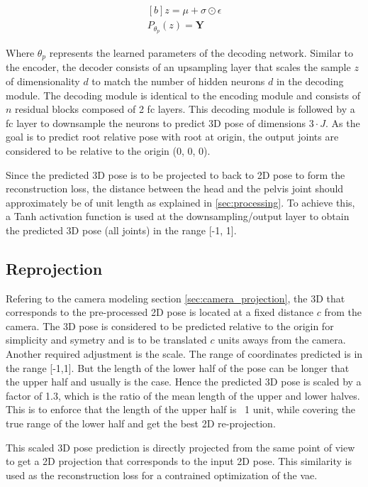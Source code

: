 \begin{equation} \label{eqn:P_fn}
    \begin{gathered}[b]
        z = \mu + \sigma \odot \epsilon \\
        P_{\theta_p}(z) = \textbf{Y}
    \end{gathered}
\end{equation}

Where $\theta_p$ represents the learned parameters of the decoding network. Similar to the encoder, the decoder consists of an upsampling layer that scales the sample $z$ of dimensionality $d$ to match the number of hidden neurons $d$ in the decoding module. The decoding module is identical to the encoding module and consists of $n$ residual blocks composed of 2 \ac{fc} layers. This decoding module is followed by a \ac{fc} layer to downsample the neurons to predict 3D pose of dimensions $3\!\cdot\!J$. As the goal is to predict root relative pose with root at origin, the output joints are considered to be relative to the origin (0, 0, 0).

Since the predicted 3D pose is to be projected to back to 2D pose to form the reconstruction loss, the distance between the head and the pelvis joint should approximately be of unit length as explained in \ref{sec:processing}. To achieve this, a Tanh activation function is used at the downsampling/output layer to obtain the predicted 3D pose (all joints) in the range [-1, 1]. %

\subsection{Reprojection}
\label{subsec:reproject}
Refering to the camera modeling section \ref{sec:camera_projection}, the 3D that corresponds to the pre-processed 2D pose is located at a fixed distance $c$ from the camera. The 3D pose is considered to be predicted relative to the origin for simplicity and symetry and is to be translated $c$ units aways from the camera. Another required adjustment is the scale. The range of coordinates predicted is in the range [-1,1]. But the length of the lower half of the pose can be longer that the upper half and usually is the case. Hence the predicted 3D pose is scaled by a factor of 1.3, which is the ratio of the mean length of the upper and lower halves. This is to enforce that the length of the upper half is ~1 unit, while covering the true range of the lower half and get the best 2D re-projection.

This scaled 3D pose prediction is directly projected from the same point of view to get a 2D projection that corresponds to the input 2D pose. This similarity is used as the reconstruction loss for a contrained optimization of the \ac{vae}.

